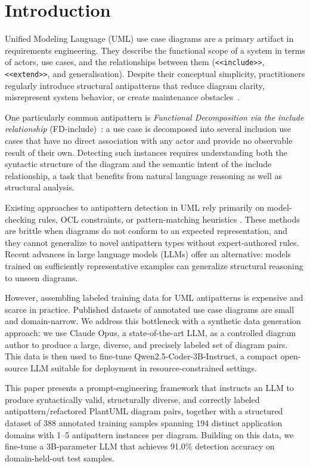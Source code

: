 \documentclass[12pt, a4paper]{article}
\begin{document}
\section{Introduction}
\label{sec:intro}

Unified Modeling Language (UML) use case diagrams are a primary artifact in
requirements engineering.  They describe the functional scope of a
system in terms of actors, use cases, and the relationships between them
(\texttt{<<include>>}, \texttt{<<extend>>}, and generalisation).  Despite their
conceptual simplicity, practitioners regularly introduce structural antipatterns that reduce
diagram clarity, misrepresent system behavior, or create maintenance
obstacles~\cite{lilly1999pitfalls,anda2001quality}.

One particularly common antipattern is \emph{Functional Decomposition via
the include relationship} (FD-include)~\cite{elattar2006matching,elattar2010improving}: a use case is decomposed into several
inclusion use cases that have no direct association with any actor and
provide no observable result of their own.  Detecting such instances requires
understanding both the syntactic structure of the diagram and the semantic
intent of the include relationship, a task that benefits from natural language
reasoning as well as structural analysis.

Existing approaches to antipattern detection in UML rely primarily on
model-checking rules, OCL constraints, or pattern-matching heuristics
\cite{gogolla2003validation,ballis2008rule,fourati2011metric}.  These methods are brittle when diagrams
do not conform to an expected representation, and they cannot generalize to
novel antipattern types without expert-authored rules.  Recent advances in
large language models (LLMs) offer an alternative: models trained on
sufficiently representative examples can generalize structural reasoning to
unseen diagrams.

However, assembling labeled training data for UML antipatterns is expensive
and scarce in practice.  Published datasets of annotated use case diagrams are
small and domain-narrow.  We address this bottleneck with a synthetic
data generation approach: we use Claude Opus, a state-of-the-art LLM, as a
controlled diagram author to produce a large, diverse, and precisely
labeled set of diagram pairs.  This data is then used to fine-tune
Qwen2.5-Coder-3B-Instruct, a compact open-source LLM suitable for
deployment in resource-constrained settings.

This paper presents a prompt-engineering framework
that instructs an LLM to produce syntactically valid, structurally diverse,
and correctly labeled antipattern/refactored PlantUML diagram pairs, together
with a structured dataset of 388 annotated training samples spanning 194
distinct application domains with 1--5 antipattern instances per diagram.
Building on this data, we fine-tune a 3B-parameter LLM that achieves 91.0\%
detection accuracy on domain-held-out test samples.
\end{document}
